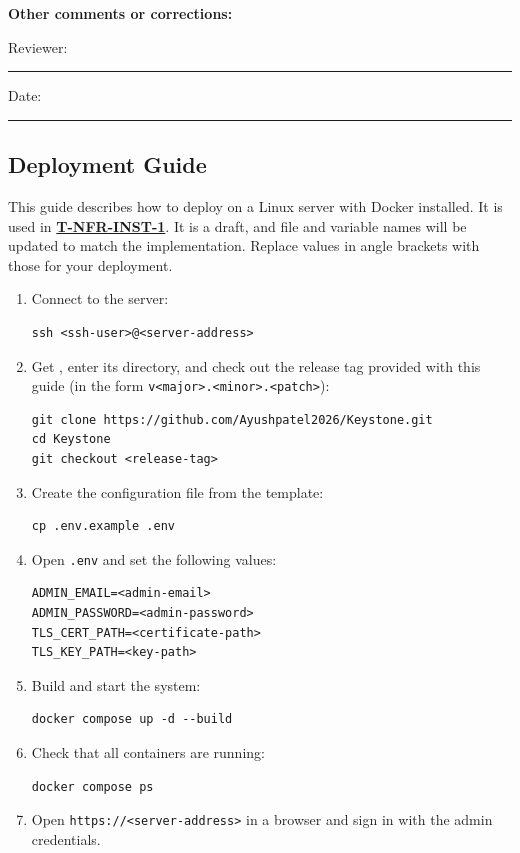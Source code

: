 \documentclass[12pt, titlepage]{article}
\begin{document}
  \noindent \textbf{Other comments or corrections:}

  \vspace{1.2cm}

  \noindent Reviewer: \rule{5cm}{0.4pt} \hspace{1cm} Date: \rule{3cm}{0.4pt}

\subsection{Deployment Guide}
\label{app:deployment-guide}

This guide describes how to deploy \projname{} on a Linux server with Docker
installed. It is used in \hyperref[T-NFR-INST-1]{\textbf{T-NFR-INST-1}}. It is a
draft, and file and variable names will be updated to match the implementation.
Replace values in angle brackets with those for your deployment.

\begin{enumerate}
  \item Connect to the server:
\begin{verbatim}
ssh <ssh-user>@<server-address>
\end{verbatim}
  \item Get \projname{}, enter its directory, and check out the release tag
  provided with this guide (in the form \verb|v<major>.<minor>.<patch>|):
\begin{verbatim}
git clone https://github.com/Ayushpatel2026/Keystone.git
cd Keystone
git checkout <release-tag>
\end{verbatim}
  \item Create the configuration file from the template:
\begin{verbatim}
cp .env.example .env
\end{verbatim}
  \item Open \texttt{.env} and set the following values:
\begin{verbatim}
ADMIN_EMAIL=<admin-email>
ADMIN_PASSWORD=<admin-password>
TLS_CERT_PATH=<certificate-path>
TLS_KEY_PATH=<key-path>
\end{verbatim}
  \item Build and start the system:
\begin{verbatim}
docker compose up -d --build
\end{verbatim}
  \item Check that all containers are running:
\begin{verbatim}
docker compose ps
\end{verbatim}
  \item Open \verb|https://<server-address>| in a browser and sign in with
  the admin credentials.
\end{enumerate}
\end{document}
